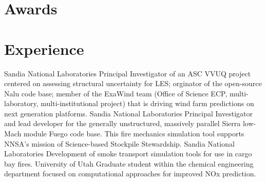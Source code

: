 \documentclass[letterpaper]{twentysecondcv_spd} %
\begin{document}
\section{Awards}

\begin{twentyshort} %
\end{twentyshort}


\section{Experience}

\begin{twenty} %
	 {Sandia National Laboratories} {Principal Investigator of an
ASC VVUQ project centered on assessing structural uncertainty for LES; orginator of the open-source 
Nalu code base; member of the ExaWind team (Office of Science ECP, multi-laboratory, multi-institutional project) that is
driving wind farm predictions on next generation platforms.}
	 {Sandia National Laboratories}  {Principal Investigator
 and lead developer for the generally unstructured, massively parallel Sierra low-Mach module Fuego code base. This fire mechanics
simulation tool supports NNSA's mission of Science-based Stockpile Stewardship.}
	 {Sandia National Laboratories} {Development of smoke transport simulation
tools for use in cargo bay fires.}
	 {University of Utah} {Graduate student within the chemical engineering department
 focused on computational approaches for improved NOx prediction.}
\end{twenty}

\end{document}
